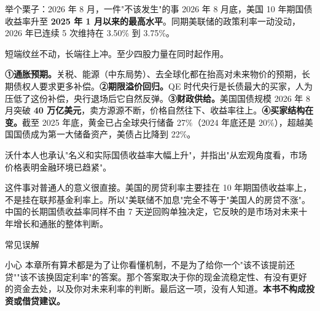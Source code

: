 \begin{egbox}{举个栗子：2026 年 8 月，一件"不该发生"的事}
2026 年 8 月底，美国 10 年期国债收益率升至 \textbf{2025 年 1 月以来的最高水平}。同期美联储的政策利率一动没动，2026 年已连续 5 次维持在 3.50\% 到 3.75\%。

短端纹丝不动，长端往上冲。至少四股力量在同时起作用。

\textbf{①通胀预期。}关税、能源（中东局势）、去全球化都在抬高对未来物价的预期，长期债权人要求更多补偿。\textbf{②期限溢价回归。}QE 时代央行是长债最大的买家，人为压低了这份补偿，央行退场后它自然反弹。\textbf{③财政供给。}美国国债规模 2026 年 8 月突破 \textbf{40 万亿美元}，卖方源源不断，价格自然往下、收益率往上。\textbf{④买家结构在变。}截至 2025 年底，黄金已占全球央行储备 27\%（2024 年底还是 20\%），超越美国国债成为第一大储备资产，美债占比降到 22\%。

沃什本人也承认"名义和实际国债收益率大幅上升"，并指出"从宏观角度看，市场价格表明金融环境已趋紧"。

\end{egbox}

这件事对普通人的意义很直接。美国的房贷利率主要挂在 10 年期国债收益率上，不是挂在联邦基金利率上。所以"美联储不加息"完全不等于"美国人的房贷不涨"。中国的长期国债收益率同样不由 7 天逆回购单独决定，它反映的是市场对未来十年增长和通胀的整体判断。

\begin{mythbox}{常见误解}
\end{mythbox}

\begin{warnbox}{小心}
本章所有算术都是为了让你看懂机制，不是为了给你一个"该不该提前还贷""该不该换固定利率"的答案。那个答案取决于你的现金流稳定性、有没有更好的资金去处，以及你对未来利率的判断。最后这一项，没有人知道。\textbf{本书不构成投资或借贷建议。}

\end{warnbox}

\bookbreak

